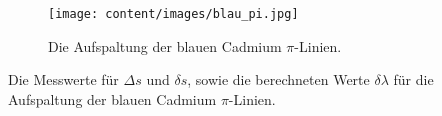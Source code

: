 \begin{figure}
	\centering
	\texttt{[image: content/images/blau\_pi.jpg]}
	\caption{Die Aufspaltung der blauen Cadmium $\pi$-Linien.}
	\label{fig:blau_pi}
\end{figure}

\begin{table}
	\centering
	\caption{Die Messwerte für $\Delta s$ und $\delta s$, sowie die berechneten Werte $\delta\lambda$ für die Aufspaltung der blauen Cadmium $\pi$-Linien.}
	
	\label{tab:blau_pi}
\end{table}
